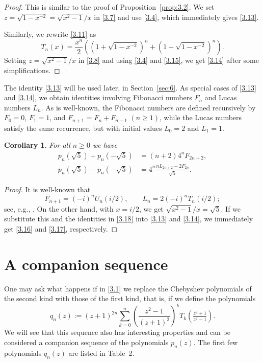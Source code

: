 \documentclass{amsart}
\theoremstyle{plain}
\newtheorem{corollary}[theorem]{Corollary}
\numberwithin{equation}{section}
\begin{document}
\begin{proof}
This is similar to the proof of Proposition~\ref{prop:3.2}. We set
$z=\sqrt{1-x^{-2}}=\sqrt{x^2-1}/x$ in \eqref{3.7} and use \eqref{3.4}, which
immediately gives \eqref{3.13}. 

Similarly, we rewrite \eqref{3.11} as
\begin{equation}\label{3.15}
T_n(x)=\frac{x^n}{2}\left(\left(1+\sqrt{1-x^{-2}}\right)^n
+\left(1-\sqrt{1-x^{-2}}\right)^n\right).
\end{equation}
Setting $z=\sqrt{x^2-1}/x$ in \eqref{3.8} and using \eqref{3.4} and 
\eqref{3.15}, we get \eqref{3.14} after some simplifications.
\end{proof}

The identity \eqref{3.13} will be used later, in Section~\ref{sec:6}.
As special cases of \eqref{3.13} and \eqref{3.14}, we obtain identities 
involving Fibonacci numbers $F_n$ and Lucas numbers $L_n$. As is well-known,
the Fibonacci numbers are defined recursively by $F_0=0$, $F_1=1$, and 
$F_{n+1}=F_n+F_{n-1}$ $(n\geq 1)$, while the Lucas numbers satisfy the same
recurrence, but with initial values $L_0=2$ and $L_1=1$.

\begin{corollary}\label{cor:3.5}
For all $n\geq 0$ we have
\begin{align}
p_n(\sqrt{5})+p_n(-\sqrt{5})
&= (n+2)4^nF_{2n+2},\label{3.16} \\
p_n(\sqrt{5})-p_n(-\sqrt{5})
&=4^n\frac{nL_{2n+2}-2F_{2n}}{\sqrt{5}}. \label{3.17}
\end{align}
\end{corollary}

\begin{proof}
It is well-known that 
\begin{equation}\label{3.18}
F_{n+1}=(-i)^nU_n(i/2),\qquad L_n=2(-i)^n T_n(i/2);
\end{equation}
see, e.g., \cite[pp. 61f]{Ri}. On the other hand, with $x=i/2$, we get
$\sqrt{x^2-1}/x=\sqrt{5}$. If we substitute this and the identities in 
\eqref{3.18} into \eqref{3.13} and \eqref{3.14}, we immediately get \eqref{3.16}
and \eqref{3.17}, respectively.
\end{proof}

\section{A companion sequence}\label{sec:4}

One may ask what happens if in \eqref{3.1} we replace the Chebyshev polynomials
of the second kind with those of the first kind, that is, if we define the
polynomials 
\begin{equation}\label{4.1}
q_n(z) := (z+1)^{2n}\sum_{k=0}^n\left(\frac{z^2-1}{(z+1)^2}\right)^k
T_k(\tfrac{z^2+1}{z^2-1}).
\end{equation}
We will see that this sequence also has interesting properties and can be 
considered a companion sequence of the polynomials $p_n(z)$. The first few
polynomials $q_n(z)$ are listed in Table~2.
\end{document}
